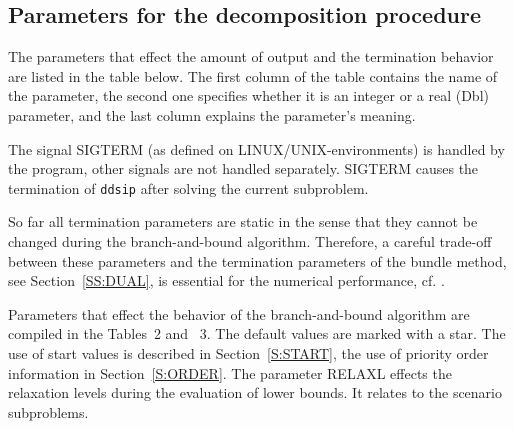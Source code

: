 \documentclass[11pt,draft]{article}
\newcommand{\+}{{\ti{+}}}
\newcommand{\1}{{\ti{1}}}
\begin{document}
%
\subsection{Parameters for the decomposition procedure}
The parameters that effect the amount of output and the termination behavior are listed in the table 
below. The first column of the table contains the name of the parameter, the second one
specifies whether it is an integer or a real (Dbl) parameter, and the last column explains the
parameter's meaning. 

The signal SIGTERM (as defined on LINUX/UNIX-environments) is handled by the program,
other signals are not handled separately. SIGTERM causes the termination of \texttt{ddsip} after 
solving the current subproblem. 

So far all termination parameters are static in the sense that they cannot be changed during the
branch-and-bound algorithm. Therefore, a careful trade-off between these parameters and the
termination parameters of the bundle method, see Section~\ref{SS:DUAL}, is essential for the
numerical performance, cf. \cite{cs2}.  \medskip  

Parameters that effect the behavior of the branch-and-bound algorithm are compiled in the
Tables~2 and ~3. The default values are marked with a star.
The use of start values is described in
Section~\ref{S:START}, the use of priority order information in Section~\ref{S:ORDER}.  The
parameter RELAXL effects the relaxation levels during the evaluation of lower bounds. It relates to
the scenario subproblems. 
\end{document}

